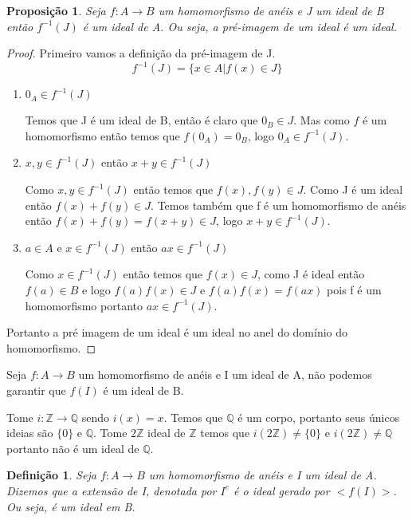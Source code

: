 \documentclass[10pt,a4paper]{article}
\newtheorem{proposition}[theorem]{Proposição}
\newtheorem{definition}[theorem]{Definição}
\begin{document}
\begin{proposition}
	Seja $f:A \rightarrow B$ um homomorfismo de anéis e J um ideal de B então $f^{-1}(J)$ é um ideal de A. Ou seja, a pré-imagem de um ideal é um ideal.
\end{proposition}
\begin{proof}
	Primeiro vamos a definição da pré-imagem de J. $$f^{-1}(J)=\{x \in A | f(x) \in J\}$$
	
	\begin{enumerate}
		\item $0_A \in f^{-1}(J)$
		
		Temos que J é um ideal de B, então é claro que $0_B \in J$. Mas como $f$ é um homomorfismo então temos que $f(0_A)=0_B$, logo $0_A \in f^{-1}(J)$.
		
		\item $x,y \in f^{-1}(J)$ então $x+y \in f^{-1}(J)$
		
		Como $x,y \in f^{-1}(J)$ então temos que $f(x),f(y) \in J$. Como J é um ideal então $f(x)+f(y) \in J$. Temos também que f é um homomorfismo de anéis então $f(x)+f(y)=f(x+y) \in J$, logo $x+y \in f^{-1}(J)$. 
		
		\item $a \in A$ e $x \in f^{-1}(J)$ então $ax \in f^{-1}(J)$
		
		Como $x \in f^{-1}(J)$ então temos que $f(x) \in J$, como J é ideal então $f(a) \in B$ e logo $f(a)f(x) \in J$ e $f(a)f(x)=f(ax)$ pois f é um homomorfismo portanto $ax \in f^{-1}(J)$.
	\end{enumerate}

	Portanto a pré imagem de um ideal é um ideal no anel do domínio do homomorfismo.
\end{proof}

	Seja $f:A \rightarrow B$ um homomorfismo de anéis e I um ideal de A, não podemos garantir que $f(I)$ é um ideal de B.
	
	Tome $i:\mathbb{Z} \rightarrow \mathbb{Q}$ sendo $i(x)=x$. Temos que $\mathbb{Q}$ é um corpo, portanto seus únicos ideias são $\{0\}$ e $\mathbb{Q}$. Tome $2\mathbb{Z}$ ideal de $\mathbb{Z}$ temos que $i(2\mathbb{Z}) \neq \{0\}$ e $i(2\mathbb{Z}) \neq \mathbb{Q}$ portanto não é um ideal de $\mathbb{Q}$.
	
\begin{definition}
	Seja $f:A \rightarrow B$ um homomorfismo de anéis e I um ideal de A. Dizemos que a extensão de I, denotada por $I^{e}$ é o ideal gerado por $<f(I)>$. Ou seja, é um ideal em B.
\end{definition}
\end{document}
